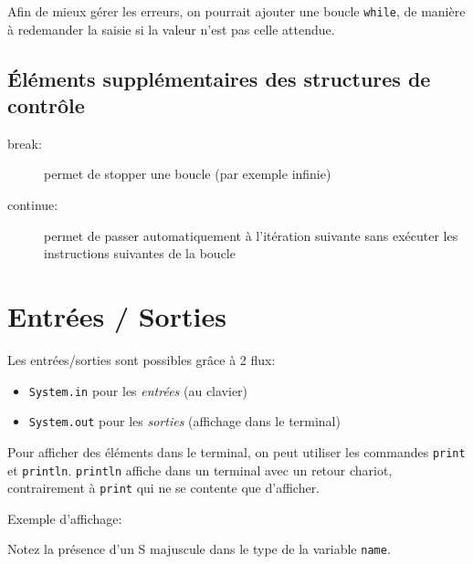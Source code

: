 				\begin{remarque}
					Afin de mieux gérer les erreurs, on pourrait ajouter une boucle \lstinline|while|, de manière à redemander la saisie si la valeur n'est pas celle attendue.
				\end{remarque}
			
			\subsection{Éléments supplémentaires des structures de contrôle}
			
				\begin{description}
					\item[break:] permet de stopper une boucle (par exemple infinie)
					\item[continue:] permet de passer automatiquement à l'itération suivante sans exécuter les instructions suivantes de la boucle
				\end{description}
			
		\section{Entrées / Sorties}
		
			Les entrées/sorties sont possibles grâce à 2 flux:
			\begin{itemize}
				\item \lstinline|System.in| pour les \emph{entrées} (au clavier)
				\item \lstinline|System.out| pour les \emph{sorties} (affichage dans le terminal)
			\end{itemize}
		
			Pour afficher des éléments dans le terminal, on peut utiliser les commandes \lstinline|print| et \lstinline|println|.
			\lstinline|println| affiche dans un terminal avec un retour chariot, contrairement à \lstinline|print| qui ne se contente que d'afficher.
			
			\begin{exemple}
				Exemple d'affichage:
				
			\end{exemple}
		
			\begin{remarque}
				Notez la présence d'un \og S\fg{} majuscule dans le type de la variable \lstinline|name|.
				
			\end{remarque}
			
